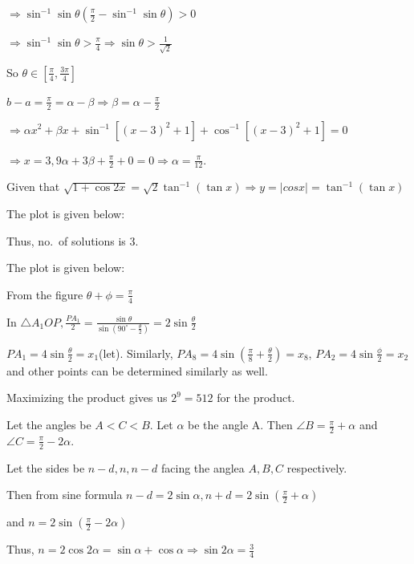   $\Rightarrow \sin^{-1}\sin\theta \left(\frac{\pi}{2} - \sin^{-1}\sin\theta\right)> 0$

  $\Rightarrow \sin^{-1}\sin\theta > \frac{\pi}{4}\Rightarrow \sin\theta > \frac{1}{\sqrt{2}}$

  So $\theta\in\left[\frac{\pi}{4}, \frac{3\pi}{4}\right]$

  $b - a = \frac{\pi}{2} = \alpha - \beta\Rightarrow \beta = \alpha - \frac{\pi}{2}$

  $\Rightarrow \alpha x^2 + \beta x + \sin^{-1}\left[(x - 3)^2 + 1\right] + \cos^{-1}\left[(x - 3)^2 +
    1\right] = 0$

  $\Rightarrow x = 3, 9\alpha + 3\beta + \frac{\pi}{2} + 0 = 0\Rightarrow \alpha = \frac{\pi}{12}$.
\item Given that $\sqrt{1 + \cos2x} = \sqrt{2}\tan^{-1}(\tan x)\Rightarrow y = |cos x| = \tan^{-1}(\tan x)$

  The plot is given below:

  \startplacefigure
    \externalfigure[17_33.pdf]
  \stopplacefigure

  Thus, no.\ of solutions is $3$.
\item The plot is given below:

  \startplacefigure
    \externalfigure[17_34.pdf]
  \stopplacefigure

  From the figure $\theta + \phi = \frac{\pi}{4}$

  In $\triangle A_1OP, \frac{PA_1}{2}= \frac{\sin\theta}{\sin\left(90^\circ - \frac{\theta}{2}\right)} =
  2\sin\frac{\theta}{2}$

  $PA_1 = 4\sin\frac{\theta}{2} = x_1$(let). Similarly, $PA_8 = 4\sin\left(\frac{\pi}{8}
  + \frac{\theta}{2}\right) = x_8$, $PA_2 = 4\sin\frac{\phi}{2} = x_2$ and other points can be determined
  similarly as well.

  Maximizing the product gives us $2^9 = 512$ for the product.
\item Let the angles be $A < C < B$. Let $\alpha$ be the angle A. Then $\angle B = \frac{\pi}{2} + \alpha$
  and $\angle C = \frac{\pi}{2} - 2\alpha$.

  Let the sides be $n - d, n, n - d$ facing the anglea $A, B, C$ respectively.

  Then from sine formula $n - d = 2\sin\alpha, n + d = 2\sin\left(\frac{\pi}{2} + \alpha\right)$

  and $n = 2\sin\left(\frac{\pi}{2} - 2\alpha\right)$

  Thus, $n = 2\cos2\alpha = \sin\alpha + \cos\alpha\Rightarrow \sin2\alpha = \frac{3}{4}$

